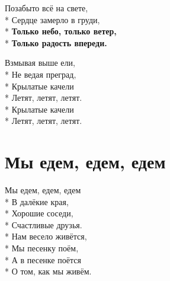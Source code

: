 \medskip

\begin{minipage}{\linewidth}
Позабыто всё на свете,\\*
Сердце замерло в груди,\\*
\textbf{Только небо, только ветер,}\\*
\textbf{Только радость впереди.}\\
\end{minipage}\par\medskip\nobreak

\medskip

\begin{minipage}{\linewidth}
\hspace*{1.5em}Взмывая выше ели,\\*
\hspace*{1.5em}Не ведая преград,\\*
\hspace*{1.5em}Крылатые качели\\*
\hspace*{1.5em}Летят, летят, летят.\\*
\hspace*{1.5em}Крылатые качели\\*
\hspace*{1.5em}Летят, летят, летят.\\
\end{minipage}

\vspace{\fill}\newpage

\section{Мы едем, едем, едем}
\label{song:Мы_едем,_едем,_едем}

\begin{minipage}{\linewidth}
Мы едем, едем, едем\\*
В далёкие края,\\*
Хорошие соседи,\\*
Счастливые друзья.\\*
Нам весело живётся,\\*
Мы песенку поём,\\*
А в песенке поётся\\*
О том, как мы живём.\\
\end{minipage}\par\medskip\nobreak

\medskip

